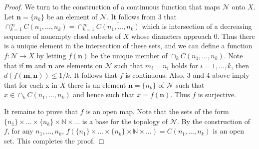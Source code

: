 \documentclass[11pt]{article}
\theoremstyle{plain}
\theoremstyle{definition}
\theoremstyle{remark}
\begin{document}
\begin{proof}
    We turn to the construction of a continuous function that maps $\mathscr N$ onto $X$.
    Let $\mathbf n =\{n_k\}$ be an element of $\mathscr N$.
    It follows from 3 that $\cap_{k=1}^\infty C(n_1,\dots,n_k) = \cap_{k=1}^\infty \overline{C(n_1,\dots,n_k)}$ which is intersection of a decreasing sequence of nonempty closd subsets of $X$ whose diameters approach $0$.
    Thus there is a unique element in the intersection of these sets, and we can define a function $f: \mathscr N \to X$ by letting $f(\mathbf n)$ be the unique member of $\cap_k C(n_1,\dots,n_k)$.
    Note that if $\mathbf m$ and $\mathbf n$ are elements on $\mathscr N$ such that $m_i=n_i$ holds for $i=1,\dots,k$, then $d(f(\mathbf m, \mathbf n))\leq 1/k$.
    It follows that $f$ is continuous.
    Also, 3 and 4 above imply that for each x in $X$ there is an element $\mathbf n = \{n_k\}$ of $\mathscr N$ such that $x\in \cap_k C(n_1,\dots,n_k)$ and hence such that $x=f(\mathbf n)$. 
    Thus $f$ is surjective.

    It remains to prove that $f$ is an open map.
    Note that the sets of the form $\{n_1\}\times \dots \times \{n_k\} \times \mathbb N \times \dots$ is a base for the topology of $\mathscr N$.
    By the construction of $f$, for any $n_1,\dots,n_k$, $f(\{n_1\}\times \dots \times \{n_k\} \times \mathbb N \times \dots)=C(n_1,\dots,n_k)$ is an open set.
    This completes the proof.

\end{proof}
\end{document}
